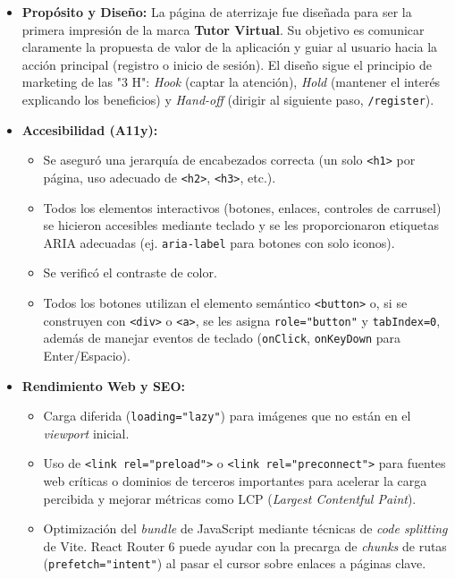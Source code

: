 \begin{itemize}[leftmargin=*]
  \item \textbf{Propósito y Diseño:} La página de aterrizaje fue diseñada para ser la primera impresión de la marca \textbf{Tutor Virtual}. Su objetivo es comunicar claramente la propuesta de valor de la aplicación y guiar al usuario hacia la acción principal (registro o inicio de sesión). El diseño sigue el principio de marketing de las "3 H": \textit{Hook} (captar la atención), \textit{Hold} (mantener el interés explicando los beneficios) y \textit{Hand-off} (dirigir al siguiente paso, \texttt{/register}).

  \item \textbf{Accesibilidad (A11y):}
        \begin{itemize}
          \item Se aseguró una jerarquía de encabezados correcta (un solo \texttt{<h1>} por página, uso adecuado de \texttt{<h2>}, \texttt{<h3>}, etc.).
          \item Todos los elementos interactivos (botones, enlaces, controles de carrusel) se hicieron accesibles mediante teclado y se les proporcionaron etiquetas ARIA adecuadas (ej. \texttt{aria-label} para botones con solo iconos).
          \item Se verificó el contraste de color.
          \item Todos los botones utilizan el elemento semántico \texttt{<button>} o, si se construyen con \texttt{<div>} o \texttt{<a>}, se les asigna \texttt{role="button"} y \texttt{tabIndex=0}, además de manejar eventos de teclado (\texttt{onClick}, \texttt{onKeyDown} para Enter/Espacio).
        \end{itemize}

  \item \textbf{Rendimiento Web y SEO:}
        \begin{itemize}
          \item Carga diferida (\texttt{loading="lazy"}) para imágenes que no están en el \emph{viewport} inicial.
          \item Uso de \texttt{<link rel="preload">} o \texttt{<link rel="preconnect">} para fuentes web críticas o dominios de terceros importantes para acelerar la carga percibida y mejorar métricas como LCP (\textit{Largest Contentful Paint}).
          \item Optimización del \emph{bundle} de JavaScript mediante técnicas de \emph{code splitting} de Vite. React Router 6 puede ayudar con la precarga de \emph{chunks} de rutas (\texttt{prefetch="intent"}) al pasar el cursor sobre enlaces a páginas clave.
        \end{itemize}
\end{itemize}

